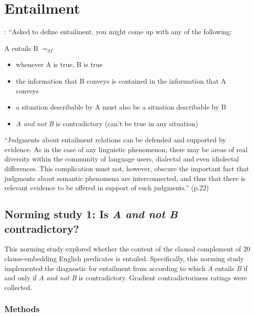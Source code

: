 \documentclass[11pt,fleqn]{article}
\newcommand{\6}{\mbox{$[\hspace*{-.6mm}[$}}
\newcommand{\9}{\mbox{$]\hspace*{-.6mm}]$}}
\begin{document}
\section{Entailment}\label{s-norming2}

\citealt[19f.]{ccmg90}: ``Asked to define entailment, you might come up with any of the following:

\begin{exe}
\ex A entails B $=_{df}$

\begin{itemize}[leftmargin=5ex,topsep=0pt,itemsep=-2pt]

\item whenever A is true, B is true

\item the information that B conveys is contained in the information that A conveys

\item a situation describable by A must also be a situation describable by B

\item {\em A and not B} is contradictory (can't be true in any situation)

\end{itemize}
\end{exe}

``Judgments about entailment relations can be defended and supported by evidence. As in the case of any linguistic phenomenon, there may be areas of real diversity within the community of language users, dialectal and even idiolectal differences. This complication must not, however, obscure the important fact that judgments about semantic phenomena are interconnected, and thus that there is relevant evidence to be offered in support of such judgments.'' (p.22)

\subsection{Norming study 1: Is {\em A and not B} contradictory?}

This norming study explored whether the content of the clausal complement of 20 clause-embedding English predicates is entailed. Specifically, this norming study implemented the diagnostic for entailment from \citealt{ccmg90} according to which {\em A} entails {\em B} if and only if {\em A and not B} is contradictory. Gradient contradictoriness ratings were collected.

\subsubsection{Methods}\label{s-methods-2}
\end{document}
